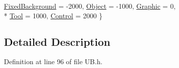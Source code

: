 \begin{DoxyCompactItemize}
\hyperlink{struct_u_b_item_layer_type_ad19bfadfaeb8bac929f4db7eb33a0c76a62a2a46f8a166127e772b661d66b0c4e}{Fixed\-Background} =  -\/2000, 
\hyperlink{struct_u_b_item_layer_type_ad19bfadfaeb8bac929f4db7eb33a0c76a86b481353d96038e1b371f5ef6f5e44f}{Object} =  -\/1000, 
\hyperlink{struct_u_b_item_layer_type_ad19bfadfaeb8bac929f4db7eb33a0c76a2519ea8eb26743716276df61a977cb2a}{Graphic} =  0, 
\\*
\hyperlink{struct_u_b_item_layer_type_ad19bfadfaeb8bac929f4db7eb33a0c76a6a39d921f91e17c4ac61cd4f28e98b2d}{Tool} =  1000, 
\hyperlink{struct_u_b_item_layer_type_ad19bfadfaeb8bac929f4db7eb33a0c76ab96e374be4d9beaa4679165e7f9bcba1}{Control} =  2000
 \}
\end{DoxyCompactItemize}


\subsection{Detailed Description}


Definition at line 96 of file U\-B.\-h.



